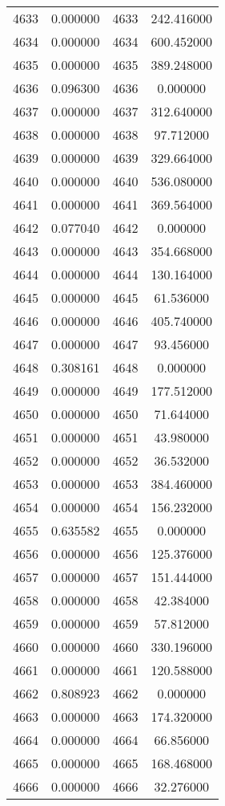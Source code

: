 \documentclass[12pt]{article}
\begin{document}
\begin{longtable}{@{}cccc@{}}
4633 & 0.000000 & 4633 & 242.416000 \\
4634 & 0.000000 & 4634 & 600.452000 \\
4635 & 0.000000 & 4635 & 389.248000 \\
4636 & 0.096300 & 4636 & 0.000000 \\
4637 & 0.000000 & 4637 & 312.640000 \\
4638 & 0.000000 & 4638 & 97.712000 \\
4639 & 0.000000 & 4639 & 329.664000 \\
4640 & 0.000000 & 4640 & 536.080000 \\
4641 & 0.000000 & 4641 & 369.564000 \\
4642 & 0.077040 & 4642 & 0.000000 \\
4643 & 0.000000 & 4643 & 354.668000 \\
4644 & 0.000000 & 4644 & 130.164000 \\
4645 & 0.000000 & 4645 & 61.536000 \\
4646 & 0.000000 & 4646 & 405.740000 \\
4647 & 0.000000 & 4647 & 93.456000 \\
4648 & 0.308161 & 4648 & 0.000000 \\
4649 & 0.000000 & 4649 & 177.512000 \\
4650 & 0.000000 & 4650 & 71.644000 \\
4651 & 0.000000 & 4651 & 43.980000 \\
4652 & 0.000000 & 4652 & 36.532000 \\
4653 & 0.000000 & 4653 & 384.460000 \\
4654 & 0.000000 & 4654 & 156.232000 \\
4655 & 0.635582 & 4655 & 0.000000 \\
4656 & 0.000000 & 4656 & 125.376000 \\
4657 & 0.000000 & 4657 & 151.444000 \\
4658 & 0.000000 & 4658 & 42.384000 \\
4659 & 0.000000 & 4659 & 57.812000 \\
4660 & 0.000000 & 4660 & 330.196000 \\
4661 & 0.000000 & 4661 & 120.588000 \\
4662 & 0.808923 & 4662 & 0.000000 \\
4663 & 0.000000 & 4663 & 174.320000 \\
4664 & 0.000000 & 4664 & 66.856000 \\
4665 & 0.000000 & 4665 & 168.468000 \\
4666 & 0.000000 & 4666 & 32.276000 \\

\end{longtable}
\end{document}
